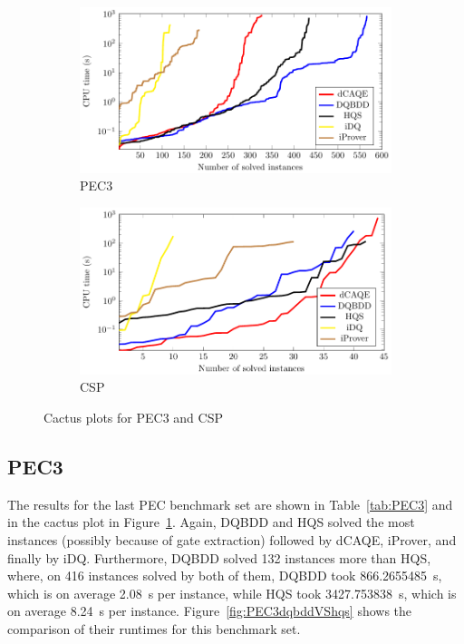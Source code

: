 \documentclass[
  digital, %
  color,
  twoside, %
  table,   %
  nolof,     %
  nolot,     %
]{fithesis3}
\theoremstyle{definition}
\theoremstyle{remark}
\begin{document}
\begin{figure}
  \centering
  \begin{subfigure}{0.98\textwidth}
    \centering
    \includegraphics[width=\textwidth]{figures/PEC3logcactusplot.pdf}
    \caption{PEC3}
    \label{fig:cactusPEC3}
  \end{subfigure}
  \begin{subfigure}{0.98\textwidth}
    \centering
    \includegraphics[width=\textwidth]{figures/CSPlogcactusplot.pdf}
    \caption{CSP}
    \label{fig:cactusCSP}
  \end{subfigure}
  \caption{Cactus plots for PEC3 and CSP}
  \label{fig:cactusPEC3CSP}
\end{figure}

\subsection{PEC3}
The results for the last PEC benchmark set are shown in Table~\ref{tab:PEC3} and in the cactus plot in Figure~\ref{fig:cactusPEC3}. Again, DQBDD and HQS solved the most instances (possibly because of gate extraction) followed by dCAQE, iProver, and finally by iDQ. Furthermore, DQBDD solved \num{132} instances more than HQS, where, on 416 instances solved by both of them, DQBDD took \SI{866.2655485}{s}, which is on average \SI{2.08}{s} per instance, while HQS took \SI{3427.753838}{s}, which is on average \SI{8.24}{s} per instance. Figure~\ref{fig:PEC3dqbddVShqs} shows the comparison of their runtimes for this benchmark set.
\end{document}
